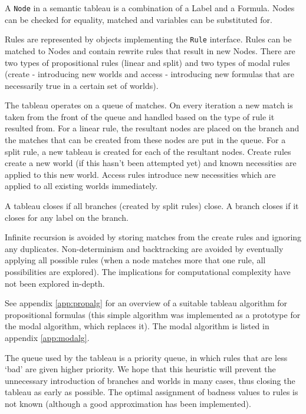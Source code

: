 A {\tt Node} in a semantic tableau is a combination of a Label and a Formula.
Nodes can be checked for equality, matched and variables can be substituted
for.

Rules are represented by objects implementing the {\tt Rule} interface. Rules
can be matched to Nodes and contain rewrite rules that result in new Nodes.
There are two types of propositional rules (linear and split) and two types of
modal rules (create - introducing new worlds and access - introducing new
formulas that are necessarily true in a certain set of worlds).

The tableau operates on a queue of matches. On every iteration a new match is
taken from the front of the queue and handled based on the type of rule it
resulted from. For a linear rule, the resultant nodes are placed on the branch
and the matches that can be created from these nodes are put in the queue. For
a split rule, a new tableau is created for each of the resultant nodes. Create
rules create a new world (if this hasn't been attempted yet) and known
necessities are applied to this new world. Access rules introduce new
necessities which are applied to all existing worlds immediately.

A tableau closes if all branches (created by split rules) close. A branch
closes if it closes for any label on the branch.

Infinite recursion is avoided by storing matches from the create rules and
ignoring any duplicates. Non-determinism and backtracking are avoided by
eventually applying all possible rules (when a node matches more that one
rule, all possibilities are explored). The implications for computational
complexity have not been explored in-depth.

See appendix \ref{app:propalg} for an overview of a suitable tableau algorithm
for propositional formulas (this simple algorithm was implemented as a
prototype for the modal algorithm, which replaces it). The modal algorithm is
listed in appendix \ref{app:modalg}.

The queue used by the tableau is a priority queue, in which rules that are
less `bad' are given higher priority. We hope that this heuristic will prevent
the unnecessary introduction of branches and worlds in many cases, thus
closing the tableau as early as possible. The optimal assignment of badness
values to rules is not known (although a good approximation has been
implemented).
